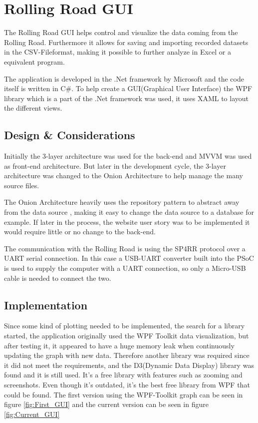 \section{Rolling Road GUI}

The Rolling Road GUI helps control and visualize the data coming from the Rolling Road. Furthermore it allows for saving and importing recorded datasets in the CSV-Fileformat, making it possible to further analyze in Excel or a equivalent program.

The application is developed in the .Net framework by Microsoft and the code itself is written in C\#.
To help create a GUI(Graphical User Interface) the WPF library which is a part of the .Net framework was used, it uses XAML to layout the different views.

\subsection{Design \& Considerations}
Initially the 3-layer architecture was used for the back-end and MVVM was used as front-end architecture. But later in the development cycle, the 3-layer architecture was changed to the Onion Architecture to help manage the many source files.

The Onion Architecture heavily uses the repository pattern to abstract away from the data source , making it easy to change the data source to a database for example. If later in the process, the website user story was to be implemented it would require little or no change to the back-end.

The communication with the Rolling Road is using the SP4RR protocol over a UART serial connection. In this case a USB-UART converter built into the PSoC is used to supply the computer with a UART connection, so only a Micro-USB cable is needed to connect the two.

\subsection{Implementation}
Since some kind of plotting needed to be implemented, the search for a library started, the application originally used the WPF Toolkit data visualization\cite{WPf_Toolkit}, but after testing it, it appeared to have a huge memory leak when continuously updating the graph with new data. Therefore another library was required since it did not meet the requirements, and the D3(Dynamic Data Display) library\cite{WPf_D3} was found and it is still used. It's a free library with features such as zooming and screenshots. Even though it's outdated, it's the best free library from WPF that could be found. The first version using the WPF-Toolkit graph can be seen in figure \vref{fig:First_GUI} and the current version can be seen in figure \vref{fig:Current_GUI}

